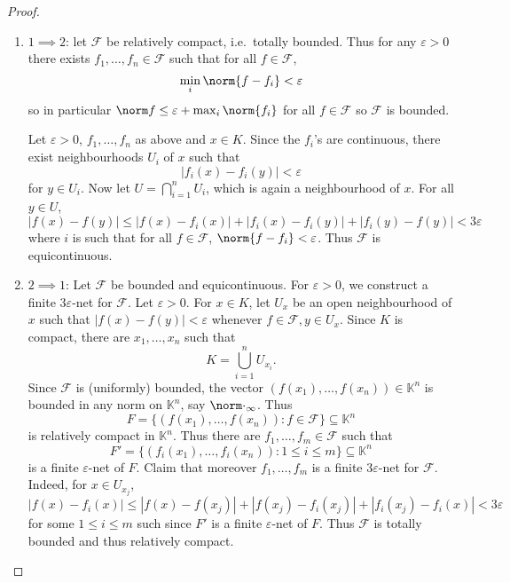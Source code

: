 \documentclass[a4paper]{article}
\newcommand{\K}{{\mathbb{K}}} %
\begin{document}
\begin{proof}\leavevmode
  \begin{enumerate}
  \item \(1 \implies 2\): let \(\mathcal F\) be relatively compact, i.e.\ totally bounded. Thus for any \(\varepsilon > 0\) there exists \(f_1, \dots, f_n \in \mathcal F\) such that for all \(f \in \mathcal F\),
    \[
      \min_i \norm{f - f_i} < \varepsilon
    \]
    so in particular \(\norm f \leq \varepsilon + \max_i \norm{f_i}\) for all \(f \in \mathcal F\) so \(\mathcal F\) is bounded.

    Let \(\varepsilon > 0\), \(f_1, \dots, f_n\) as above and \(x \in K\). Since the \(f_i\)'s are continuous, there exist neighbourhoods \(U_i\) of \(x\) such that
    \[
      |f_i(x) - f_i(y)| < \varepsilon
    \]
    for \(y \in U_i\). Now let \(U = \bigcap_{i = 1}^n U_i\), which is again a neighbourhood of \(x\). For all \(y \in U\),
    \[
      |f(x) - f(y)|
      \leq |f(x) - f_i(x)| + |f_i(x) - f_i(y)| + |f_i(y) - f(y)|
      < 3\varepsilon
    \]
    where \(i\) is such that for all \(f \in \mathcal F\), \(\norm{f - f_i} < \varepsilon\). Thus \(\mathcal F\) is equicontinuous.
  \item \(2 \implies 1\): Let \(\mathcal F\) be bounded and equicontinuous. For \(\varepsilon > 0\), we construct a finite \(3\varepsilon\)-net for \(\mathcal F\). Let \(\varepsilon > 0\). For \(x \in K\), let \(U_x\) be an open neighbourhood of \(x\) such that \(|f(x) - f(y)| < \varepsilon\) whenever \(f \in \mathcal F, y \in U_x\). Since \(K\) is compact, there are \(x_1, \dots, x_n\) such that
    \[
      K = \bigcup_{i = 1}^n U_{x_i}.
    \]
    Since \(\mathcal F\) is (uniformly) bounded, the vector \((f(x_1), \dots, f(x_n)) \in \K^n\) is bounded in any norm on \(\K^n\), say \(\norm \cdot_\infty\). Thus
    \[
      F = \{(f(x_1), \dots, f(x_n)): f \in \mathcal F\} \subseteq \K^n
    \]
    is relatively compact in \(\K^n\). Thus there are \(f_1, \dots, f_m \in \mathcal F\) such that
    \[
      F' = \{(f_i(x_1), \dots, f_i(x_n)): 1 \leq i \leq m\} \subseteq \K^n
    \]
    is a finite \(\varepsilon\)-net of \(F\). Claim that moreover \(f_1, \dots, f_m\) is a finite \(3\varepsilon\)-net for \(\mathcal F\). Indeed, for \(x \in U_{x_j}\),
    \[
      |f(x) - f_i(x)|
      \leq |f(x) - f(x_j)| + |f(x_j) - f_i(x_j)| + |f_i(x_j) - f_i(x)|
      < 3 \varepsilon
    \]
    for some \(1 \leq i \leq m\) such since \(F'\) is a finite \(\varepsilon\)-net of \(F\). Thus \(\mathcal F\) is totally bounded and thus relatively compact.
  \end{enumerate}
\end{proof}
\end{document}
